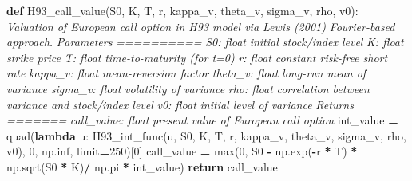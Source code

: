 \documentclass[
]{book}
\newenvironment{Shaded}{\begin{snugshade}}{\end{snugshade}}
\newcommand{\BuiltInTok}[1]{#1}
\newcommand{\CommentTok}[1]{\textcolor[rgb]{0.56,0.35,0.01}{\textit{#1}}}
\newcommand{\ControlFlowTok}[1]{\textcolor[rgb]{0.13,0.29,0.53}{\textbf{#1}}}
\newcommand{\DecValTok}[1]{\textcolor[rgb]{0.00,0.00,0.81}{#1}}
\newcommand{\KeywordTok}[1]{\textcolor[rgb]{0.13,0.29,0.53}{\textbf{#1}}}
\newcommand{\NormalTok}[1]{#1}
\newcommand{\OperatorTok}[1]{\textcolor[rgb]{0.81,0.36,0.00}{\textbf{#1}}}
\begin{document}
\begin{Shaded}
\begin{Highlighting}[]
\KeywordTok{def}\NormalTok{ H93\_call\_value(S0, K, T, r, kappa\_v, theta\_v, sigma\_v, rho, v0):}
  \CommentTok{\textquotesingle{}\textquotesingle{}\textquotesingle{} Valuation of European call option in H93 model via Lewis (2001)}
\CommentTok{  Fourier{-}based approach.}
\CommentTok{  Parameters}
\CommentTok{  ==========}
\CommentTok{  S0: float}
\CommentTok{  initial stock/index level}
\CommentTok{  K: float}
\CommentTok{  strike price}
\CommentTok{  T: float}
\CommentTok{  time{-}to{-}maturity (for t=0)}
\CommentTok{  r: float}
\CommentTok{  constant risk{-}free short rate}
\CommentTok{  kappa\_v: float}
\CommentTok{  mean{-}reversion factor}
\CommentTok{  theta\_v: float}
\CommentTok{  long{-}run mean of variance}
\CommentTok{  sigma\_v: float}
\CommentTok{  volatility of variance}
\CommentTok{  rho: float}
\CommentTok{  correlation between variance and stock/index level}
\CommentTok{  v0: float}
\CommentTok{  initial level of variance}
\CommentTok{  Returns}
\CommentTok{  =======}
\CommentTok{  call\_value: float}
\CommentTok{  present value of European call option}
\CommentTok{  \textquotesingle{}\textquotesingle{}\textquotesingle{}}
\NormalTok{  int\_value }\OperatorTok{=}\NormalTok{ quad(}\KeywordTok{lambda}\NormalTok{ u: H93\_int\_func(u, S0, K, T, r, kappa\_v, theta\_v, sigma\_v, rho, v0), }\DecValTok{0}\NormalTok{, np.inf, limit}\OperatorTok{=}\DecValTok{250}\NormalTok{)[}\DecValTok{0}\NormalTok{]}
\NormalTok{  call\_value }\OperatorTok{=} \BuiltInTok{max}\NormalTok{(}\DecValTok{0}\NormalTok{, S0 }\OperatorTok{{-}}\NormalTok{ np.exp(}\OperatorTok{{-}}\NormalTok{r }\OperatorTok{*}\NormalTok{ T) }\OperatorTok{*}\NormalTok{ np.sqrt(S0 }\OperatorTok{*}\NormalTok{ K)}\OperatorTok{/}\NormalTok{ np.pi }\OperatorTok{*}\NormalTok{ int\_value)}
  \ControlFlowTok{return}\NormalTok{ call\_value}


\end{Highlighting}
\end{Shaded}
\end{document}
